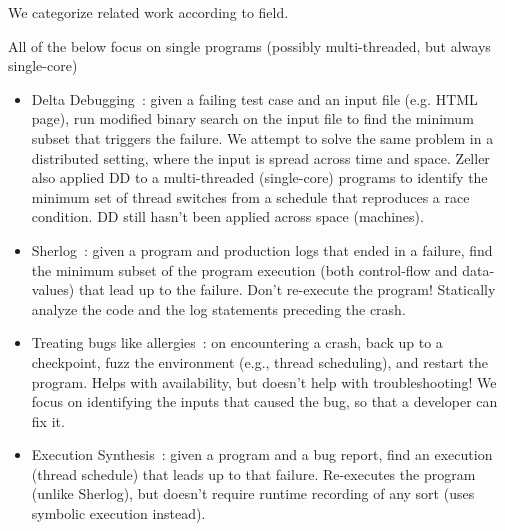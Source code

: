 We categorize related work according to field.

All of the below focus on single programs (possibly multi-threaded, but always single-core)
\begin{itemize}
\item Delta Debugging~\cite{Zeller:2002:SIF:506201.506206}: given a failing test case and an input file (e.g. HTML page), run modified binary search on the input file to find the minimum subset that triggers the failure. We attempt to solve the same problem in a distributed setting, where the input is spread across time and space. Zeller also applied DD to a multi-threaded (single-core) programs to identify the minimum set of thread switches from a schedule that reproduces a race condition. DD still hasn't been applied across space (machines).
\item Sherlog~\cite{Yuan:2010:SED:1736020.1736038}: given a program and production logs that ended in a failure, find the minimum subset of the program execution (both control-flow and data-values) that lead up to the failure. Don't re-execute the program! Statically analyze the code and the log statements preceding the crash.
\item Treating bugs like allergies~\cite{qin2005rx}: on encountering a crash, back up to a checkpoint, fuzz the environment (e.g., thread scheduling), and restart the program. Helps with availability, but doesn't help with troubleshooting! We focus on identifying the inputs that caused the bug, so that a developer can fix it.
\item Execution Synthesis~\cite{Zamfir:2010:EST:1755913.1755946}: given a program and a bug report, find an
execution (thread schedule) that leads up to that failure. Re-executes the
program (unlike Sherlog), but doesn't require runtime recording of any sort
(uses symbolic execution instead).
\end{itemize}

